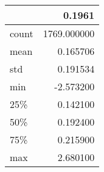 \begin{tabular}{lr}
\toprule
{} &       0.1961 \\
\midrule
count &  1769.000000 \\
mean  &     0.165706 \\
std   &     0.191534 \\
min   &    -2.573200 \\
25\%   &     0.142100 \\
50\%   &     0.192400 \\
75\%   &     0.215900 \\
max   &     2.680100 \\
\bottomrule
\end{tabular}
